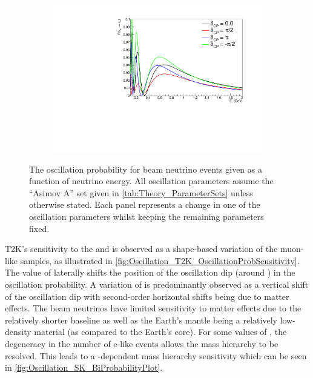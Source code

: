 \begin{figure}[h]
\begin{subfigure}[t]{0.5\textwidth}
    \includegraphics[width=\textwidth, trim={0mm 0mm 0mm 0mm}, clip,page=1]{Figures/Oscillation/T2K_NuMu_x_NuE_DCPSens.pdf}
    \subcaption{\dcp}
  \end{subfigure}
  \caption{The oscillation probability for beam neutrino events given as a function of neutrino energy. All oscillation parameters assume the ``Asimov A'' set given in \autoref{tab:Theory_ParameterSets} unless otherwise stated. Each panel represents a change in one of the oscillation parameters whilst keeping the remaining parameters fixed.}
  \label{fig:Oscillation_T2K_OscillationProbSensitivity}
\end{figure}

T2K's sensitivity to the \sinsqatm and \delmsqatm is observed as a shape-based variation of the muon-like samples, as illustrated in \autoref{fig:Oscillation_T2K_OscillationProbSensitivity}. The value of  laterally shifts the position of the oscillation dip (around ) in the  oscillation probability. A variation of \sinsqatm is predominantly observed as a vertical shift of the oscillation dip with second-order horizontal shifts being due to matter effects. The beam neutrinos have limited sensitivity to matter effects due to the relatively shorter baseline as well as the Earth's mantle being a relatively low-density material (as compared to the Earth's core). For some values of \dcp, the degeneracy in the number of e-like events allows the mass hierarchy to be resolved. This leads to a \dcp-dependent mass hierarchy sensitivity which can be seen in \autoref{fig:Oscillation_SK_BiProbabilityPlot}.

